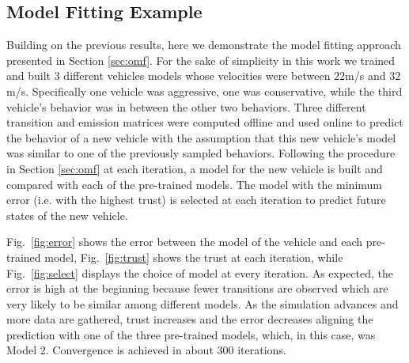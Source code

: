 \documentclass[letterpaper, 10 pt, conference]{ieeeconf}  %
\begin{document}
\subsection{Model Fitting Example}

Building on the previous results, here we demonstrate the model fitting approach presented in Section \ref{sec:omf}. For the sake of simplicity in this work we trained and built 3 different vehicles models whose velocities were between $22$m/s and $32$m/s. Specifically one vehicle was aggressive, one was conservative, while the third vehicle's behavior was in between the other two behaviors. Three different transition and emission matrices were computed offline and used online to predict the behavior of a new vehicle with the assumption that this new vehicle's model was similar to one of the previously sampled behaviors. Following the procedure in Section \ref{sec:omf} at each iteration, a model for the new vehicle is built and compared with each of the pre-trained models. The model with the minimum error (i.e. with the highest trust) is selected at each iteration to predict future states of the new vehicle.

Fig.~\ref{fig:error} shows the error between the model of the vehicle and each pre-trained model, Fig.~\ref{fig:trust} shows the trust at each iteration, while Fig.~\ref{fig:select} displays the choice of model at every iteration. As expected, the error is high at the beginning because fewer transitions are observed which are very likely to be similar among different models. As the simulation advances and more data are gathered, trust increases and the error decreases aligning the prediction with one of the three pre-trained models, which, in this case, was Model 2. Convergence is achieved in about 300 iterations.  

\end{document}
